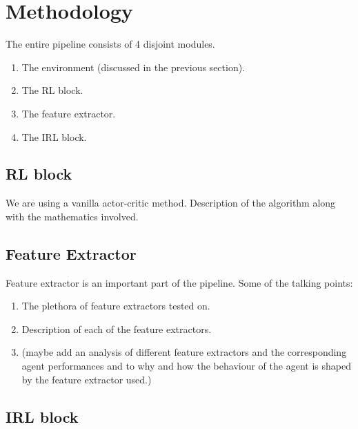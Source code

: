 \section{Methodology}
The entire pipeline consists of 4 disjoint modules.
\begin{enumerate}
    \item The environment (discussed in the previous section).
    \item The RL block.
    \item The feature extractor.
    \item The IRL block.
\end{enumerate}

\subsection{RL block}
We are using a vanilla actor-critic method. Description of the algorithm along with the mathematics involved.
\subsection{Feature Extractor}
Feature extractor is an important part of the pipeline. 
Some of the talking points:
\begin{enumerate}
    \item The plethora of feature extractors tested on.
    \item Description of each of the feature extractors.
    \item (maybe add an analysis of different feature extractors and the corresponding agent performances and to why and how the behaviour of the agent is shaped by the feature extractor used.)
\end{enumerate}
\subsection{IRL block}